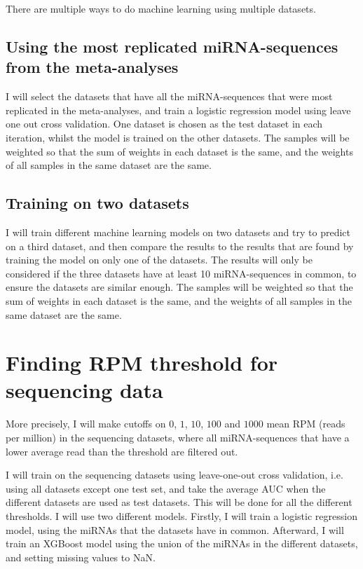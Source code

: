 There are multiple ways to do machine learning using multiple datasets.

\subsection{Using the most replicated miRNA-sequences from the meta-analyses}
\label{subsec:most_replicated}
I will select the datasets that have all the miRNA-sequences that were most replicated in the meta-analyses, and train a logistic regression model using leave one out cross validation. One dataset is chosen as the test dataset in each iteration, whilst the model is trained on the other datasets. The samples will be weighted so that the sum of weights in each dataset is the same, and the weights of all samples in the same dataset are the same. 

\subsection{Training on two datasets}
\label{sec:met_two_datasets}
I will train different machine learning models on two datasets and try to predict on a third dataset, and then compare the results to the results that are found by training the model on only one of the datasets. The results will only be considered if the three datasets have at least 10 miRNA-sequences in common, to ensure the datasets are similar enough. The samples will be weighted so that the sum of weights in each dataset is the same, and the weights of all samples in the same dataset are the same.



\section{Finding RPM threshold for sequencing data}
\label{sec:met_sequencing_thresholds}

More precisely, I will make cutoffs on $0$, $1$, $10$, $100$ and $1000$ mean RPM (reads per million) in the sequencing datasets, where all miRNA-sequences that have a lower average read than the threshold are filtered out.

I will train on the sequencing datasets using leave-one-out cross validation, i.e. using all datasets except one test set, and take the average AUC when the different datasets are used as test datasets. This will be done for all the different thresholds. I will use two different models. Firstly, I will train a logistic regression model, using the miRNAs that the datasets have in common. Afterward, I will train an XGBoost model using the union of the miRNAs in the different datasets, and setting missing values to NaN.


